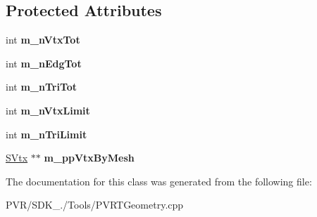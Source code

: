 \subsection*{Protected Attributes}
\begin{DoxyCompactItemize}
\item 
\hypertarget{class_c_object_a35d7e4d33915b70f7fad85e68f02f099}{int {\bfseries m\+\_\+n\+Vtx\+Tot}}\label{class_c_object_a35d7e4d33915b70f7fad85e68f02f099}

\item 
\hypertarget{class_c_object_a96d6ca48ba0890a03ae6536bf69b6f47}{int {\bfseries m\+\_\+n\+Edg\+Tot}}\label{class_c_object_a96d6ca48ba0890a03ae6536bf69b6f47}

\item 
\hypertarget{class_c_object_af373bf3fc2fa624fe5b71038f6e3b947}{int {\bfseries m\+\_\+n\+Tri\+Tot}}\label{class_c_object_af373bf3fc2fa624fe5b71038f6e3b947}

\item 
\hypertarget{class_c_object_aec01feeb6839890217eeda4317916f29}{int {\bfseries m\+\_\+n\+Vtx\+Limit}}\label{class_c_object_aec01feeb6839890217eeda4317916f29}

\item 
\hypertarget{class_c_object_a89862af800940785d6fd64fefbf80f4c}{int {\bfseries m\+\_\+n\+Tri\+Limit}}\label{class_c_object_a89862af800940785d6fd64fefbf80f4c}

\item 
\hypertarget{class_c_object_aeb2ed464527ef83c3bdac9d928a47b0f}{\hyperlink{struct_s_vtx}{S\+Vtx} $\ast$$\ast$ {\bfseries m\+\_\+pp\+Vtx\+By\+Mesh}}\label{class_c_object_aeb2ed464527ef83c3bdac9d928a47b0f}

\end{DoxyCompactItemize}


The documentation for this class was generated from the following file\+:\begin{DoxyCompactItemize}
\item 
P\+V\+R/\+S\+D\+K\+\_./\+Tools/P\+V\+R\+T\+Geometry.\+cpp\end{DoxyCompactItemize}
